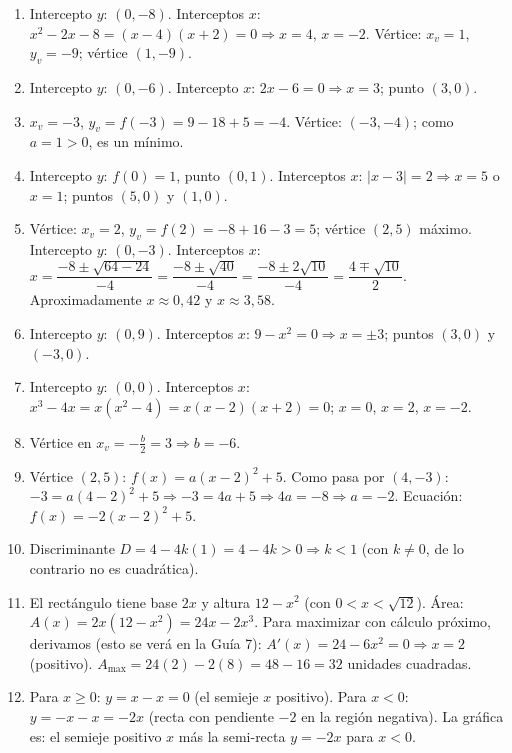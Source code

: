 \documentclass[12pt, letterpaper]{article}
\begin{document}
  \begin{enumerate}[resume=respuestas, leftmargin=*, label=\textbf{\arabic*.}]
    \item Intercepto $y$: $(0, -8)$. Interceptos $x$: $x^2 - 2x - 8 = (x - 4)(x + 2) = 0 \Rightarrow x = 4$, $x = -2$. Vértice: $x_v = 1$, $y_v = -9$; vértice $(1, -9)$.

    \item Intercepto $y$: $(0, -6)$. Intercepto $x$: $2x - 6 = 0 \Rightarrow x = 3$; punto $(3, 0)$.

    \item $x_v = -3$, $y_v = f(-3) = 9 - 18 + 5 = -4$. Vértice: $(-3, -4)$; como $a = 1 > 0$, es un mínimo.

    \item Intercepto $y$: $f(0) = 1$, punto $(0, 1)$. Interceptos $x$: $|x - 3| = 2 \Rightarrow x = 5$ o $x = 1$; puntos $(5, 0)$ y $(1, 0)$.

    \item Vértice: $x_v = 2$, $y_v = f(2) = -8 + 16 - 3 = 5$; vértice $(2, 5)$ máximo. Intercepto $y$: $(0, -3)$. Interceptos $x$: $x = \dfrac{-8 \pm \sqrt{64 - 24}}{-4} = \dfrac{-8 \pm \sqrt{40}}{-4} = \dfrac{-8 \pm 2\sqrt{10}}{-4} = \dfrac{4 \mp \sqrt{10}}{2}$. Aproximadamente $x \approx 0{,}42$ y $x \approx 3{,}58$.

    \item Intercepto $y$: $(0, 9)$. Interceptos $x$: $9 - x^2 = 0 \Rightarrow x = \pm 3$; puntos $(3, 0)$ y $(-3, 0)$.

    \item Intercepto $y$: $(0, 0)$. Interceptos $x$: $x^3 - 4x = x(x^2 - 4) = x(x-2)(x+2) = 0$; $x = 0$, $x = 2$, $x = -2$.

    \item Vértice en $x_v = -\frac{b}{2} = 3 \Rightarrow b = -6$.

    \item Vértice $(2, 5)$: $f(x) = a(x - 2)^2 + 5$. Como pasa por $(4, -3)$: $-3 = a(4-2)^2 + 5 \Rightarrow -3 = 4a + 5 \Rightarrow 4a = -8 \Rightarrow a = -2$. Ecuación: $f(x) = -2(x - 2)^2 + 5$.

    \item Discriminante $D = 4 - 4k(1) = 4 - 4k > 0 \Rightarrow k < 1$ (con $k \neq 0$, de lo contrario no es cuadrática).

    \item El rectángulo tiene base $2x$ y altura $12 - x^2$ (con $0 < x < \sqrt{12}$). Área: $A(x) = 2x(12 - x^2) = 24x - 2x^3$. Para maximizar con cálculo próximo, derivamos (esto se verá en la Guía 7): $A'(x) = 24 - 6x^2 = 0 \Rightarrow x = 2$ (positivo). $A_{\max} = 24(2) - 2(8) = 48 - 16 = 32$ unidades cuadradas.

    \item Para $x \geq 0$: $y = x - x = 0$ (el semieje $x$ positivo). Para $x < 0$: $y = -x - x = -2x$ (recta con pendiente $-2$ en la región negativa). La gráfica es: el semieje positivo $x$ más la semi-recta $y = -2x$ para $x < 0$.
  \end{enumerate}
\end{document}
